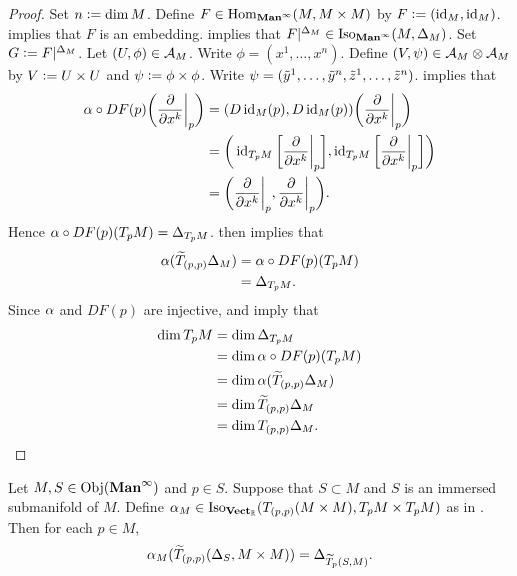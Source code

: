 \documentclass{book}
\begin{document}
\begin{proof}
	Set $n \vcentcolon= \dim M$. Define $F \in \operatorname{Hom}_{\operatorname*{\text{\textbf{Man}}^{\infty}}}(M, M \times M)$ by $F \vcentcolon= (\operatorname{id}_M, \operatorname{id}_M)$.  implies that $F$ is an embedding.  implies that $F|^{\Delta_M} \in \operatorname{Iso}_{\operatorname*{\text{\textbf{Man}}^{\infty}}}(M, \Delta_M)$. Set $G \vcentcolon= F|^{\Delta_M}$. Let $(U, \phi) \in \mathcal{A}_M$. Write $\phi = (x^1, \ldots, x^n)$. Define $(V, \psi) \in \mathcal{A}_M \otimes \mathcal{A}_M$ by $V \vcentcolon= U \times U$ and $\psi \vcentcolon= \phi \times \phi$. Write $\psi = (\tilde{y}^1, \ldots, \tilde{y}^n, \tilde{z}^1, \ldots, \tilde{z}^n)$.
	 implies that 
	\begin{align*}
		\alpha \circ DF(p) \bigg( \frac{\partial}{\partial x^k} \bigg|_{p} \bigg)
		& = (D \operatorname{id}_M(p), D \operatorname{id}_M(p)) \bigg( \frac{\partial}{\partial x^k} \bigg|_p \bigg) \\
		& = \bigg( \operatorname{id}_{T_pM} \bigg[ \frac{\partial}{\partial x^k} \bigg|_p \bigg], \operatorname{id}_{T_pM} \bigg[ \frac{\partial}{\partial x^k} \bigg|_{p} \bigg] \bigg) \\
		& = \bigg( \frac{\partial}{\partial x^k} \bigg|_p, \frac{\partial}{\partial x^k} \bigg|_p \bigg). 
	\end{align*}
	Hence $\alpha \circ DF(p)(T_p M) = \Delta_{T_p M}$.  then implies that 
	\begin{align*}
		\alpha (\widetilde{T}_{(p,p)} \Delta_M)
		& = \alpha \circ DF(p)(T_p M) \\
		& = \Delta_{T_p M}.
	\end{align*}
	Since $\alpha$ and $DF(p)$ are injective,  and  imply that
	\begin{align*}
		\dim T_pM 
		& = \dim \Delta_{T_p M} \\
		& = \dim \alpha \circ DF(p)(T_p M) \\
		& = \dim \alpha (\widetilde{T}_{(p,p)} \Delta_M) \\
		& = \dim \widetilde{T}_{(p,p)} \Delta_M \\
		& = \dim T_{(p,p)} \Delta_M.
	\end{align*} 
\end{proof}

\begin{ex} 
	Let $M, S \in \operatorname{Obj}(\operatorname*{\text{\textbf{Man}}^{\infty}})$ and $p \in S$. Suppose that $S \subset M$ and $S$ is an immersed submanifold of $M$. Define $\alpha_M \in \operatorname{Iso}_{\operatorname*{\text{\textbf{Vect}}_{\mathbb{R}}}}(T_{(p,p)}(M \times M), T_pM \times  T_pM)$ as in . Then for each $p \in M$, 
	$$\alpha_M (\widetilde{T}_{(p,p)} (\Delta_S, M \times M)) = \Delta_{\widetilde{T}_p (S, M)}.$$
\end{ex}
\end{document}
